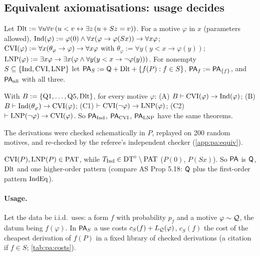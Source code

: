 \subsection{Equivalent axiomatisations: usage decides}\label{sec:pa:equiv}

Let $\mathrm{Dlt}:=\forall u\forall v\,(u<v\leftrightarrow\exists z\,(u+Sz=v))$. For a motive $\varphi$ in $x$ (parameters allowed), $\mathrm{Ind}(\varphi):=\varphi(0)\wedge\forall x(\varphi\to\varphi(Sx))\to\forall x\varphi$; $\mathrm{CVI}(\varphi):=\forall x(\theta_\varphi\to\varphi)\to\forall x\varphi$ with $\theta_\varphi:=\forall y(y<x\to\varphi(y))$; $\mathrm{LNP}(\varphi):=\exists x\varphi\to\exists x(\varphi\wedge\forall y(y<x\to\neg\varphi(y)))$. For nonempty $S\subseteq\{\mathrm{Ind},\mathrm{CVI},\mathrm{LNP}\}$ let $\mathsf{PA}_S:=\mathsf{Q}+\mathrm{Dlt}+\{f(P):f\in S\}$, $\mathsf{PA}_f:=\mathsf{PA}_{\{f\}}$, and $\mathsf{PA}_{\mathrm{all}}$ with all three.

\begin{proposition}\pabrk{}\label{prop:pa:equiv}
With $B:=\{\mathrm{Q1},\dots,\mathrm{Q5},\mathrm{Dlt}\}$, for every motive $\varphi$: (A) $B\vdash\mathrm{CVI}(\varphi)\to\mathrm{Ind}(\varphi)$; (B) $B\vdash\mathrm{Ind}(\theta_\varphi)\to\mathrm{CVI}(\varphi)$; (C1) $\vdash\mathrm{CVI}(\neg\varphi)\to\mathrm{LNP}(\varphi)$; (C2) $\vdash\mathrm{LNP}(\neg\varphi)\to\mathrm{CVI}(\varphi)$. So $\mathsf{PA}_{\mathrm{Ind}}$, $\mathsf{PA}_{\mathrm{CVI}}$, $\mathsf{PA}_{\mathrm{LNP}}$ have the same theorems.
\end{proposition}

\noindent The derivations were checked schematically in $P$, replayed on 200 random motives, and re-checked by the referee's independent checker (\cref{app:pa:equiv}).

\begin{remark}[Patterns]\pabrk{}\label{rem:pa:pat}
$\mathrm{CVI}(P),\mathrm{LNP}(P)\in\mathrm{PAT}$, while $T_{\mathrm{Ind}}\in\mathrm{DT}^{\circ}\setminus\mathrm{PAT}$ ($P(0)$, $P(Sx)$). So $\mathsf{PA}$ is $\mathsf{Q}$, $\mathrm{Dlt}$ and one higher-order pattern (compare AS Prop 5.18: $\mathsf{Q}$ plus the first-order pattern $\mathrm{IndEq}$).
\end{remark}

\paragraph{Usage.} Let the data be i.i.d.\ uses: a form $f$ with probability $p_f$ and a motive $\varphi\sim\mathcal{Q}$, the datum being $f(\varphi)$. In $\mathsf{PA}_S$ a use costs $c_S(f)+L_{\mathcal{Q}}(\varphi)$, $c_S(f)$ the cost of the cheapest derivation of $f(P)$ in a fixed library of checked derivations (a citation if $f\in S$; \cref{tab:pa:costs}).

